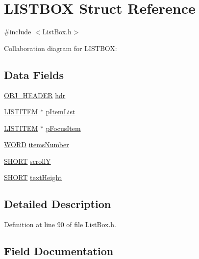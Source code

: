 \hypertarget{struct_l_i_s_t_b_o_x}{}\section{L\+I\+S\+T\+B\+O\+X Struct Reference}
\label{struct_l_i_s_t_b_o_x}


{\ttfamily \#include $<$List\+Box.\+h$>$}



Collaboration diagram for L\+I\+S\+T\+B\+O\+X\+:
\subsection*{Data Fields}
\begin{DoxyCompactItemize}
\item 
\hyperlink{struct_o_b_j___h_e_a_d_e_r}{O\+B\+J\+\_\+\+H\+E\+A\+D\+E\+R} \hyperlink{struct_l_i_s_t_b_o_x_abeffaf353197a8a64fba6707b68ce0be}{hdr}
\item 
\hyperlink{struct_l_i_s_t_i_t_e_m}{L\+I\+S\+T\+I\+T\+E\+M} $\ast$ \hyperlink{struct_l_i_s_t_b_o_x_a8a42c7074b664dc3ad6198169d3c503e}{p\+Item\+List}
\item 
\hyperlink{struct_l_i_s_t_i_t_e_m}{L\+I\+S\+T\+I\+T\+E\+M} $\ast$ \hyperlink{struct_l_i_s_t_b_o_x_aac143875b725d1509c3db4a3776fb431}{p\+Focus\+Item}
\item 
\hyperlink{_generic_type_defs_8h_a2b0e863dadf920709ec53d9088ee7c91}{W\+O\+R\+D} \hyperlink{struct_l_i_s_t_b_o_x_ac216806f811d739b00a4f5f3cf6a7286}{items\+Number}
\item 
\hyperlink{_generic_type_defs_8h_ae9bb25d3afecf3bfab0fbe3c22c2050f}{S\+H\+O\+R\+T} \hyperlink{struct_l_i_s_t_b_o_x_a3e7072db2665be3ccc135ea06961b93e}{scroll\+Y}
\item 
\hyperlink{_generic_type_defs_8h_ae9bb25d3afecf3bfab0fbe3c22c2050f}{S\+H\+O\+R\+T} \hyperlink{struct_l_i_s_t_b_o_x_a40fa9c35391b0005032180b85e7afd34}{text\+Height}
\end{DoxyCompactItemize}


\subsection{Detailed Description}


Definition at line 90 of file List\+Box.\+h.



\subsection{Field Documentation}
\hypertarget{struct_l_i_s_t_b_o_x_abeffaf353197a8a64fba6707b68ce0be}{}
